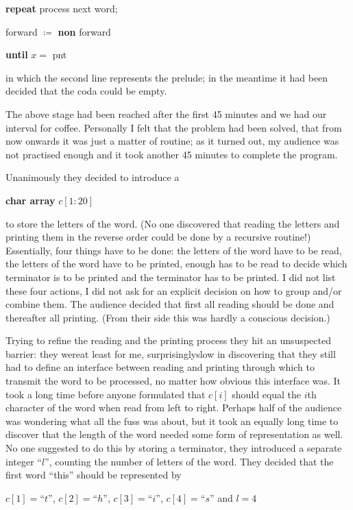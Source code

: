 \documentclass[twoside,11pt]{book}
\begin{document}
\quad \textbf{repeat} process next word;

\quad \quad forward $\coloneq$ \textbf{non} forward

\quad \textbf{until} $x =$ pnt

\noindent
in which the second line represents the prelude; in the meantime it had been decided that the coda could be empty.

The above stage had been reached after the first 45 minutes and we had our interval for coffee. Personally I felt that the problem had been solved, that from now onwards it was just a matter of routine; as it turned out, my audience was not practised enough and it took another 45 minutes to complete the program.

Unanimously they decided to introduce a

\quad \textbf{char array} $c[1:20]$

\noindent
to store the letters of the word. (No one discovered that reading the letters and printing them in the reverse order could be done by a recursive routine!) Essentially, four things have to be done: the letters of the word have to be read, the letters of the word have to be printed, enough has to be read to decide which terminator is to be printed and the terminator has to be printed. I did not list these four actions, I did not ask for an explicit decision on how to group and/or combine them. The audience decided that first all reading should be done and thereafter all printing. (From their side this was hardly a conscious decision.)

Trying to refine the reading and the printing process they hit an unsuspected barrier: they were\textemdash{}at least for me, surprisingly\textemdash{}slow in discovering that they still had to define an interface between reading and printing through which to transmit the word to be processed, no matter how obvious this interface was. It took a long time before anyone formulated that $c[i]$ should equal the $i$th character of the word when read from left to right. Perhaps half of the audience was wondering what all the fuss was about, but it took an equally long time to discover that the length of the word needed some form of representation as well. No one suggested to do this by storing a terminator, they introduced a separate integer ``$l$'', counting the number of letters of the word. They decided that the first word ``this'' should be represented by

\quad $c[1] = $``$t$'', $c[2] = $``$h$'', $c[3] = $``$i$'', $c[4] = $``$s$'' and $l = 4$
\end{document}
